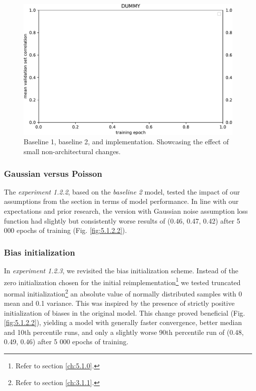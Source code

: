 \begin{figure}[H]
    \centering
    \includegraphics[width=1\textwidth]{../figures/05_dummy}
    \caption[Experiment 1.2.1 2]{Baseline 1, baseline 2, and \citeauthor{antolik} implementation. Showcasing the effect of small non-architectural changes.}
    \label{fig:5.1.2.1_2}
\end{figure}

\subsubsection{Gaussian versus Poisson}\label{ex:1.2.2}
The \emph{experiment 1.2.2}, based on the \emph{baseline 2} model, tested the impact of our assumptions from the  section in terms of model performance. In line with our expectations and prior research, the version with Gaussian noise assumption loss function had slightly but consistently worse results of (0.46, 0.47, 0.42) after 5 000 epochs of training (Fig. \ref{fig:5.1.2.2}). 

\subsubsection{Bias initialization}\label{ex:1.2.3}

In \emph{experiment 1.2.3}, we revisited the bias initialization scheme. Instead of the zero initialization chosen for the initial reimplementation\footnote{Refer to section \ref{ch:5.1.0}.} we tested truncated normal initialization\footnote{Refer to section \ref{ch:3.1.1}.} an absolute value of normally distributed samples with 0 mean and 0.1 variance. This was inspired by the presence of strictly positive initialization of biases in the original model. This change proved beneficial (Fig. \ref{fig:5.1.2.2}), yielding a model with generally faster convergence, better median and 10th percentile runs, and only a slightly worse 90th percentile run of (0.48, 0.49, 0.46) after 5 000 epochs of training.

